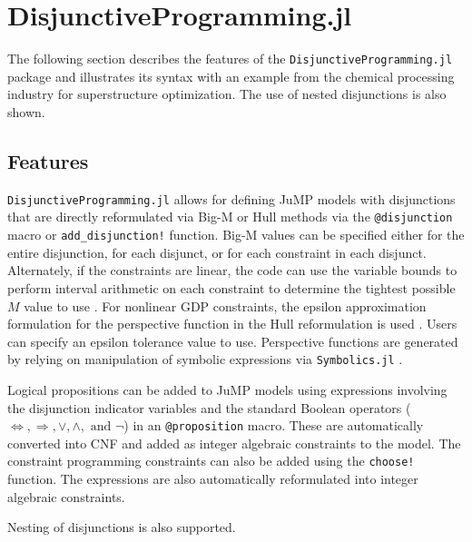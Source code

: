 \documentclass{juliacon}
\begin{document}
\section{DisjunctiveProgramming.jl}
The following section describes the features of the \verb|DisjunctiveProgramming.jl| package and illustrates its syntax with an example from the chemical processing industry for superstructure optimization. The use of nested disjunctions is also shown.

\subsection{Features}
\verb|DisjunctiveProgramming.jl| allows for defining JuMP models with disjunctions that are directly reformulated via Big-M or Hull methods via the \verb|@disjunction| macro or \verb|add_disjunction!| function. Big-M values can be specified either for the entire disjunction, for each disjunct, or for each constraint in each disjunct. Alternately, if the constraints are linear, the code can use the variable bounds to perform interval arithmetic on each constraint to determine the tightest possible $M$ value to use \cite{agarwal2010automating}. For nonlinear GDP constraints, the epsilon approximation formulation for the perspective function in the Hull reformulation is used \cite{furman_sawaya_grossmann_2020}. Users can specify an epsilon tolerance value to use. Perspective functions are generated by relying on manipulation of symbolic expressions via \verb|Symbolics.jl| \cite{10.1145/3511528.3511535}.

Logical propositions can be added to JuMP models using expressions involving the disjunction indicator variables and the standard Boolean operators ($\Leftrightarrow, \Rightarrow, \vee, \wedge, \text{ and } \neg$) in an \verb|@proposition| macro. These are automatically converted into CNF and added as integer algebraic constraints to the model. The constraint programming constraints can also be added using the \verb|choose!| function. The expressions are also automatically reformulated into integer algebraic constraints.

Nesting of disjunctions is also supported.
\end{document}
